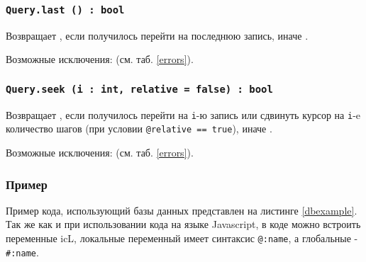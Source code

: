 \subsubsection{\texttt{Query.last () : bool}}

Возвращает \true, если получилось перейти на последнюю запись, иначе \false.

Возможные исключения:  (см. таб. \ref{errors}).

\subsubsection{\texttt{Query.seek (i : int, relative = false) : bool}}

Возвращает \true, если получилось перейти на \texttt{i}-ю запись или сдвинуть курсор на \texttt{i}-e количество шагов (при условии \texttt{@relative == true}), иначе \false.

Возможные исключения:  (см. таб. \ref{errors}).

\subsubsection{Пример}

Пример кода, использующий базы данных представлен на листинге \ref{dbexample}. Так же как и при использовании кода на языке Javascript, в коде можно встроить переменные icL, локальные переменный имеет синтаксис \texttt{@:name}, а глобальные - \texttt{\#:name}.

\begin{sourcecode}
	\label{dbexample}
    \inputminted[linenos]{icl}{../sources/dbexample.icL}
\end{sourcecode}

